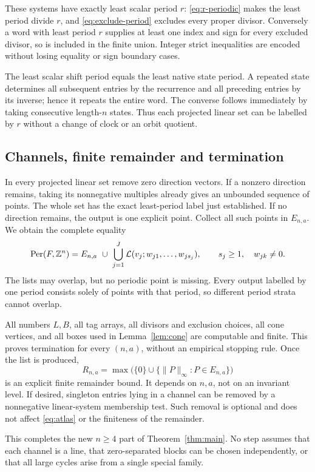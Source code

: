 These systems have exactly least scalar period $r$:
\eqref{eq:r-periodic} makes the least period divide $r$, and
\eqref{eq:exclude-period} excludes every proper divisor. Conversely
a word with least period $r$ supplies at least one index and sign
for every excluded divisor, so is included in the finite union.
Integer strict inequalities are encoded without losing equality
or sign boundary cases.

The least scalar shift period equals the least native state period.
A repeated state determines all subsequent entries by the recurrence
and all preceding entries by its inverse; hence it repeats the
entire word. The converse follows immediately by taking consecutive
length-$n$ states. Thus each projected linear set can be labelled
by $r$ without a change of clock or an orbit quotient.

\subsection{Channels, finite remainder and termination}

In every projected linear set remove zero direction vectors.
If a nonzero direction remains, taking its nonnegative multiples
already gives an unbounded sequence of points. The whole set has
the exact least-period label just established. If no direction
remains, the output is one explicit point. Collect all such points
in $E_{n,a}$. We obtain the complete equality
\begin{equation}
 \operatorname{Per}(F,\mathbb Z^n)=E_{n,a}\ \cup\
 \bigcup_{j=1}^{J}
    \mathcal L(v_j;w_{j1},\ldots,w_{js_j}),
 \qquad s_j\ge1,\quad w_{jk}\ne0.
 \label{eq:atlas}
\end{equation}
The lists may overlap, but no periodic point is missing. Every
output labelled by one period consists solely of points with that
period, so different period strata cannot overlap.

All numbers $L,B$, all tag arrays, all divisors and exclusion choices,
all cone vertices, and all boxes used in Lemma~\ref{lem:cone} are
computable and finite. This proves termination for every $(n,a)$,
without an empirical stopping rule. Once the list is produced,
\[
 R_{n,a}=\max\bigl(\{0\}\cup
          \{\|P\|_\infty:P\in E_{n,a}\}\bigr)
\]
is an explicit finite remainder bound. It depends on $n,a$, not on
an invariant level. If desired, singleton entries lying in a
channel can be removed by a nonnegative linear-system membership
test. Such removal is optional and does not affect
\eqref{eq:atlas} or the finiteness of the remainder.

This completes the new $n\ge4$ part of Theorem~\ref{thm:main}.
No step assumes that each channel is a line, that zero-separated
blocks can be chosen independently, or that all large cycles arise
from a single special family.
